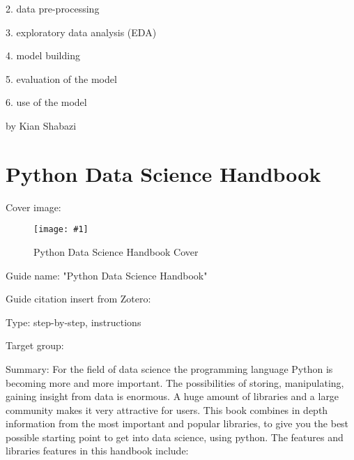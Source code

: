 \documentclass{article}
\newlength{\imgwidth}
\newcommand\scaledgraphics[2]{%
                
\settowidth{\imgwidth}{\texttt{[image: \#1]}}%
                
\setlength{\imgwidth}{\minof{\imgwidth}{#2\textwidth}}%
                
\texttt{[image: \#1]}%
                
}
\begin{document}
2. data pre-processing


3. exploratory data analysis (EDA)


4. model building


5. evaluation of the model


6. use of the model





by Kian Shabazi





\section{Python Data Science Handbook}\label{H8115129}



Cover image:


\begin{center}
\begin{figure}
\scaledgraphics{43052757-2454-42ab-a98c-c7977cb4e249.png}{0.5}
\caption*{Python Data Science Handbook Cover}\label{F16921711}
\end{figure}


\end{center}


Guide name: "Python Data Science Handbook"


Guide citation insert from Zotero: \autocite{vanderplas_python_2016}


Type: step-by-step, instructions


Target group:


Summary: For the field of data science the programming language Python is becoming more and more important. The possibilities of storing, manipulating, gaining insight from data is enormous. A huge amount of libraries and a large community makes it very attractive for users. This book combines in depth information from the most important and popular libraries, to give you the best possible starting point to get into data science, using python. The features and libraries features in this handbook include: 
\end{document}
